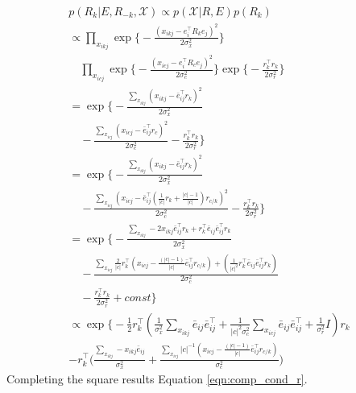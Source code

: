\documentclass{article}
\begin{document}
\begin{align*}
&p(R_k | E, R_{-k}, \mathcal{X}) \propto p(\mathcal{X} | R, E)p(R_k)&\\
&\propto \prod_{x_{ikj}}\exp\bigg\{-\frac{(x_{ikj} - e_i^\top R_k e_j)^2}{2\sigma_x^2}\bigg\} &\\
& \quad\prod_{x_{icj}} \exp\bigg\{-\frac{(x_{icj} - e_i^\top R_c e_j)^2}{2\sigma_c^2}\bigg\} \exp\bigg\{-\frac{r_k^\top r_k}{2\sigma_r^2}\bigg\}&\\
&= \exp\bigg\{-\frac{\sum_{x_{ikj}}(x_{ikj} - \bar{e}_{ij}^\top r_k)^2}{2\sigma_x^2} &\\
&\quad- \frac{\sum_{x_{icj}}(x_{icj} - \bar{e}_{ij}^\top r_c)^2}{2\sigma_c^2} -\frac{r_k^\top r_k}{2\sigma_r^2} \bigg\}&\\
&= \exp\bigg\{-\frac{\sum_{x_{ikj}}(x_{ikj} - \bar{e}_{ij}^\top r_k)^2}{2\sigma_x^2} &\\ 
&\quad-\frac{\sum_{x_{icj}}(x_{icj} - \bar{e}_{ij}^\top (\frac{1}{|c|}r_k + \frac{|c|-1}{|c|})r_{c/k})^2}{2\sigma_c^2} -\frac{r_k^\top r_k}{2\sigma_r^2} \bigg\}&\\
&= \exp\bigg\{ -\frac{\sum_{x_{ikj}}- 2 x_{ikj} \bar{e}_{ij}^\top r_k + r_k^\top \bar{e}_{ij} \bar{e}_{ij}^\top r_k }{2\sigma_x^2} &\\
&\quad-\frac{\sum_{x_{icj}} \frac{2}{|c|} r_k ^\top (x_{icj} - \frac{(|c|-1)}{|c|} \bar{e}_{ij}^\top r_{c/k}) + (\frac{1}{|c|^2}r_k^\top \bar{e}_{ij} \bar{e}_{ij}^\top r_k)}{2\sigma_c^2} &\\
&\quad-\frac{r_k^\top r_k}{2\sigma_r^2} + const \bigg\}&\\
&\propto \exp\bigg\{ - \frac{1}{2}r_k^\top(\frac{1}{\sigma_x^2}\sum_{x_{ikj}} \bar{e}_{ij}\bar{e}_{ij}^\top + \frac{1}{|c|^2\sigma_c^2}\sum_{x_{icj}} \bar{e}_{ij}\bar{e}_{ij}^\top + \frac{1}{\sigma_r^2}I) r_k  &\\
&- r_k^\top \Big(\frac{\sum_{x_{ikj}}-x_{ikj}\bar{e}_{ij}}{\sigma_x^2} + \frac{\sum_{x_{icj}} |c|^{-1} (x_{icj} - \frac{(|c|-1)}{|c|} \bar{e}_{ij}^\top r_{c/k})}{\sigma_c^2} \Big)&
\end{align*}
Completing the square results Equation \ref{eqn:comp_cond_r}.
\end{document}
